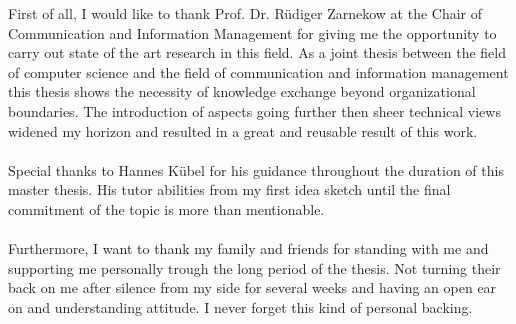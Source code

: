 \thispagestyle{empty}
\vspace*{3cm}

\vspace*{1cm}
\noindent 
First of all, I would like to thank Prof. Dr. Rüdiger Zarnekow at the Chair of Communication and Information Management for giving me the opportunity to carry out state of the art research in this field. As a joint thesis between the field of computer science and the field of communication and information management this thesis shows the necessity of knowledge exchange beyond organizational boundaries. The introduction of aspects going further then sheer technical views widened my horizon and resulted in a great and reusable result of this work. 
\\
\\
Special thanks to Hannes Kübel for his guidance throughout the duration of this master thesis. His tutor abilities from my first idea sketch until the final commitment of the topic is more than mentionable.
\\
\\
Furthermore, I want to thank my family and friends for standing with me and supporting me personally trough the long period of the thesis. Not turning their back on me after silence from my side for several weeks and having an open ear on and understanding attitude. I never forget this kind of personal backing.